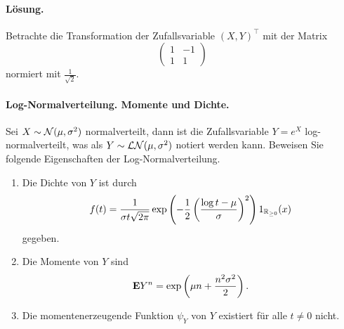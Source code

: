 \paragraph*{Lösung.} Betrachte die Transformation der Zufallsvariable $(X,Y)^\top$
mit der Matrix
\begin{equation*}
    \begin{pmatrix}
        1 & -1 \\ 1 & 1 
    \end{pmatrix}
\end{equation*}
normiert mit $\frac{1}{\sqrt{2}}$. 


\paragraph{Log-Normalverteilung. Momente und Dichte.}
Sei $X \sim \mathcal N(\mu,\sigma^2)$ normalverteilt, dann ist die Zufallsvariable 
$Y = e^{X}$ log-normalverteilt, was als $Y \sim \mathcal L\mathcal N (\mu, \sigma^2)$ notiert 
werden kann. Beweisen Sie folgende Eigenschaften der Log-Normalverteilung.
\begin{enumerate}
    \item Die Dichte von $Y$ ist durch
        \begin{equation*}
            f(t) = \frac{1}{\sigma t\sqrt{2\pi}} 
            \exp \left( -\frac{1}{2} \left( \frac{\log t -\mu}{\sigma} \right)^2  \right)
            1_{\mathbb R_{\geq 0}}(x) 
        \end{equation*} 
        gegeben.
    \item Die Momente von $Y$ sind 
        \begin{equation*}
            \mathbf{E} Y^n = \exp \left( \mu n + \frac{n^2\sigma^2}{2} \right).
        \end{equation*}
    \item Die momentenerzeugende Funktion $\psi_Y$ von $Y$ existiert für alle $t\neq 0$ nicht. 
\end{enumerate}
